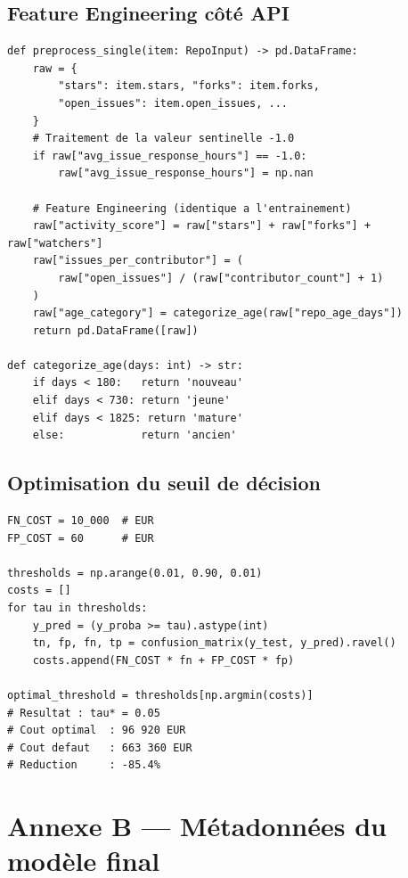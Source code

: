 \documentclass[12pt,a4paper]{article}
\begin{document}
\subsection{Feature Engineering côté API}

\begin{lstlisting}[style=python, caption={Feature engineering dans l'API (app/api.py)}, label=lst:fe_api]
def preprocess_single(item: RepoInput) -> pd.DataFrame:
    raw = {
        "stars": item.stars, "forks": item.forks,
        "open_issues": item.open_issues, ...
    }
    # Traitement de la valeur sentinelle -1.0
    if raw["avg_issue_response_hours"] == -1.0:
        raw["avg_issue_response_hours"] = np.nan

    # Feature Engineering (identique a l'entrainement)
    raw["activity_score"] = raw["stars"] + raw["forks"] + raw["watchers"]
    raw["issues_per_contributor"] = (
        raw["open_issues"] / (raw["contributor_count"] + 1)
    )
    raw["age_category"] = categorize_age(raw["repo_age_days"])
    return pd.DataFrame([raw])

def categorize_age(days: int) -> str:
    if days < 180:   return 'nouveau'
    elif days < 730: return 'jeune'
    elif days < 1825: return 'mature'
    else:            return 'ancien'
\end{lstlisting}

\subsection{Optimisation du seuil de décision}

\begin{lstlisting}[style=python, caption={Calcul du seuil optimal par minimisation du coût métier}, label=lst:threshold]
FN_COST = 10_000  # EUR
FP_COST = 60      # EUR

thresholds = np.arange(0.01, 0.90, 0.01)
costs = []
for tau in thresholds:
    y_pred = (y_proba >= tau).astype(int)
    tn, fp, fn, tp = confusion_matrix(y_test, y_pred).ravel()
    costs.append(FN_COST * fn + FP_COST * fp)

optimal_threshold = thresholds[np.argmin(costs)]
# Resultat : tau* = 0.05
# Cout optimal  : 96 920 EUR
# Cout defaut   : 663 360 EUR
# Reduction     : -85.4%
\end{lstlisting}

\section{Annexe B --- Métadonnées du modèle final}
\end{document}

